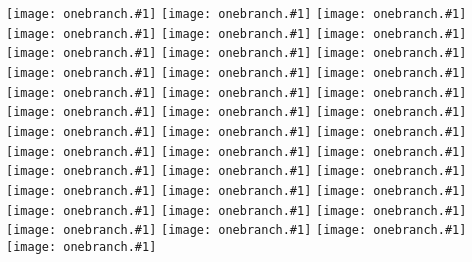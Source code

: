 \documentclass[12pt]{article}
\begin{document}
\pdfpageheight=0cm\pdfpagewidth=0cm
\pdfvorigin=0cm\pdfhorigin=0cm

\newcommand{\mpspage}[1]{\shipout\hbox{\texttt{[image: onebranch.\#1]}}}

\mpspage{1}
\mpspage{2}
\mpspage{3}
\mpspage{4}
\mpspage{5}
\mpspage{6}
\mpspage{7}
\mpspage{8}
\mpspage{9}
\mpspage{10}
\mpspage{11}
\mpspage{12}
\mpspage{13}
\mpspage{14}
\mpspage{15}
\mpspage{16}
\mpspage{17}
\mpspage{18}
\mpspage{19}
\mpspage{20}
\mpspage{21}
\mpspage{22}
\mpspage{23}
\mpspage{24}
\mpspage{25}
\mpspage{26}
\mpspage{27}
\mpspage{28}
\mpspage{29}
\mpspage{30}
\mpspage{31}
\mpspage{32}
\mpspage{33}
\mpspage{34}
\mpspage{35}
\mpspage{36}
\mpspage{37}
\end{document}
